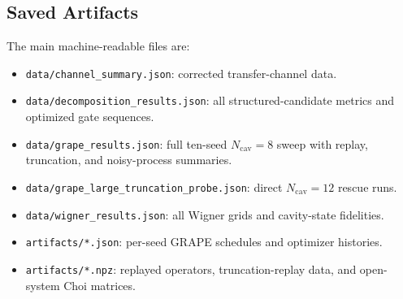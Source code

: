 \documentclass[aps,pra,twocolumn,reprint,amsmath,amssymb]{revtex4-2}
\begin{document}
\subsection{Saved Artifacts}
The main machine-readable files are:
\begin{itemize}
  \item \texttt{data/channel\_summary.json}: corrected transfer-channel data.
  \item \texttt{data/decomposition\_results.json}: all structured-candidate
  metrics and optimized gate sequences.
  \item \texttt{data/grape\_results.json}: full ten-seed $N_{\mathrm{cav}}=8$
  sweep with replay, truncation, and noisy-process summaries.
  \item \texttt{data/grape\_large\_truncation\_probe.json}: direct
  $N_{\mathrm{cav}}=12$ rescue runs.
  \item \texttt{data/wigner\_results.json}: all Wigner grids and cavity-state
  fidelities.
  \item \texttt{artifacts/*.json}: per-seed GRAPE schedules and optimizer
  histories.
  \item \texttt{artifacts/*.npz}: replayed operators, truncation-replay data,
  and open-system Choi matrices.
\end{itemize}
\end{document}
